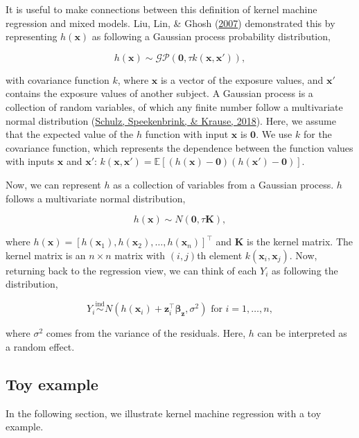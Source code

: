 \documentclass[12pt, twoside]{amherstthesis}
\begin{document}
It is useful to make connections between this definition of kernel machine regression and mixed models. Liu, Lin, \& Ghosh (\protect\hyperlink{ref-liu_semiparametric_2007}{2007}) demonstrated this by representing \(h(\textbf{x})\) as following a Gaussian process probability distribution,

\[
h(\textbf{x}) \sim \mathcal{GP}(\textbf{0}, \tau k(\textbf{x}, \textbf{x}')),
\]

\noindent with covariance function \(k\), where \(\textbf{x}\) is a vector of the exposure values, and \(\textbf{x}'\) contains the exposure values of another subject. A Gaussian process is a collection of random variables, of which any finite number follow a multivariate normal distribution (\protect\hyperlink{ref-schulz_tutorial_2018}{Schulz, Speekenbrink, \& Krause, 2018}). Here, we assume that the expected value of the \(h\) function with input \(\textbf{x}\) is \(\textbf{0}\). We use \(k\) for the covariance function, which represents the dependence between the function values with inputs \(\textbf{x}\) and \(\textbf{x}'\): \(k(\textbf{x}, \textbf{x}') = \mathbb{E}[(h(\textbf{x})- \textbf{0}) (h(\textbf{x}')- \textbf{0})]\).

Now, we can represent \(h\) as a collection of variables from a Gaussian process. \(h\) follows a multivariate normal distribution,

\[
h({\textbf{x}}) \sim N(\textbf{0}, \tau\textbf{K}),
\]

\noindent where \(h({\textbf{x}}) = [h(\textbf{x}_1), h(\textbf{x}_2), \dots, h(\textbf{x}_n)]^\top\) and \(\textbf{K}\) is the kernel matrix. The kernel matrix is an \(n \times n\) matrix with \((i, j)\)th element \(k(\textbf{x}_i, \textbf{x}_j)\). Now, returning back to the regression view, we can think of each \(Y_i\) as following the distribution,

\[
Y_i \overset{\mathrm{ind}}{\sim} N(h(\textbf{x}_i) + \textbf{z}_i^\top \boldsymbol{\beta}_{\textbf{z}}, \sigma^2) \text{ for } i = 1,\dots,n,
\]

\noindent where \(\sigma^2\) comes from the variance of the residuals. Here, \(h\) can be interpreted as a random effect.

\hypertarget{bkmrtoy}{%
\subsection{Toy example}\label{bkmrtoy}}

In the following section, we illustrate kernel machine regression with a toy example.
\end{document}
